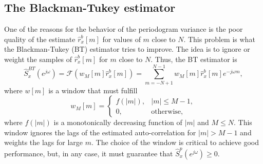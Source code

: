 \subsection{The Blackman-Tukey estimator}

One of the reasons for the behavior of the periodogram variance is the poor quality of the estimate $\hat{r}_{x}^{b}[m]$ for values of $m$ close to $N$. This problem is what the Blackman-Tukey (BT) estimator tries to improve. The idea is to ignore or weight the samples of $\hat{r}_{x}^{b}[m]$ for $m$ close to $N$. Thus, the BT estimator is
\begin{equation}
\label{eq:BT_definition}
\hat{S}_x^{BT}(e^{j \omega}) = \mathcal{F}(w_M[m] \hat{r}_{x}^{b}[m]) = \sum_{m = -N + 1}^{N-1} w_M[m] \hat{r}_{x}^{b}[m] e^{-j \omega m},
\end{equation}
where $w[m]$ is a window that must fulfill
\begin{equation}
w_{M}[m] = \begin{cases} f(|m|), & |m| \leq M-1, \\
0, & \text{otherwise},
\end{cases}
\end{equation}
where $f(|m|)$ is a monotonically decreasing function of $|m|$ and $M \leq N$. This window ignores the lags of the estimated auto-correlation for $|m|>M-1$ and weights  the lags for large $m$. The choice of the window  is critical to achieve good performance, but, in any case, it must guarantee that $\hat{S}_x^{p}(e^{j \omega}) \geq 0$.

